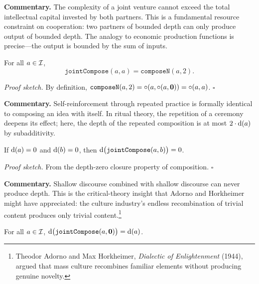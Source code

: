 \noindent\textbf{Commentary.}
The complexity of a joint venture cannot exceed the total intellectual
capital invested by both partners.  This is a fundamental resource constraint
on cooperation: two partners of bounded depth can only produce output of
bounded depth.  The analogy to economic production functions is precise---the
output is bounded by the sum of inputs.

\begin{theorem}
\label{thm:joint_self_is_composeN2}
For all $a \in \mathcal{I}$,
\[
  \texttt{jointCompose}(a, a) = \texttt{composeN}(a, 2).
\]
\end{theorem}

\noindent\textit{Proof sketch.}\quad
By definition, $\texttt{composeN}(a, 2) = \circ(a, \circ(a, \mathbf{0}))
= \circ(a, a)$.
\hfill$\square$

\medskip

\noindent\textbf{Commentary.}
Self-reinforcement through repeated practice is formally identical to
composing an idea with itself.  In ritual theory, the repetition of a
ceremony deepens its effect; here, the depth of the repeated composition is
at most $2 \cdot \operatorname{d}(a)$ by subadditivity.

\begin{theorem}
\label{thm:trivial_cooperation}
If $\operatorname{d}(a) = 0$ and $\operatorname{d}(b) = 0$, then
$\operatorname{d}\bigl(\texttt{jointCompose}(a, b)\bigr) = 0$.
\end{theorem}

\noindent\textit{Proof sketch.}\quad
From the depth-zero closure property of composition.
\hfill$\square$

\medskip

\noindent\textbf{Commentary.}
Shallow discourse combined with shallow discourse can never produce depth.
This is the critical-theory insight that Adorno and Horkheimer might have
appreciated: the culture industry's endless recombination of trivial content
produces only trivial content.\footnote{Theodor Adorno and Max Horkheimer,
\textit{Dialectic of Enlightenment} (1944), argued that mass culture
recombines familiar elements without producing genuine novelty.}

\begin{theorem}
\label{thm:void_cooperation_depth}
For all $a \in \mathcal{I}$,
$\operatorname{d}\bigl(\texttt{jointCompose}(a, \mathbf{0})\bigr) = \operatorname{d}(a)$.
\end{theorem}


